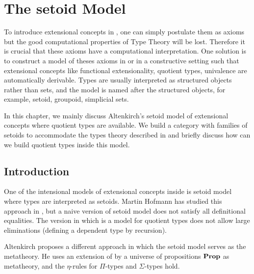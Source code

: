 

\chapter{The setoid Model}\label{models}


To introduce extensional concepts in \itt, one can simply postulate them as axioms but the good computational properties of Type Theory will be lost. Therefore it is crucial that these axioms have 
a computational interpretation. One solution is to construct a model of theses axioms in \itt or in a constructive setting such that extensional concepts like functional extensionality, quotient types, univalence are automatically derivable. Types are usually interpreted as structured objects rather than sets, and the model is named after the structured objects, for example, setoid, groupoid, simplicial sets. 



In this chapter, we mainly discuss Altenkirch's setoid model of extensional concepts where quotient types are available. We build a category with families of setoids to accommodate the types theory described in
\cite{alti:lics99}  and briefly discuss how can we build quotient types inside this model.

\section{Introduction}\label{setoidmodel}


One of the intensional models of extensional concepts inside \itt is setoid model where types are interpreted as setoids. Martin Hofmann has studied this approach in \cite{hof:phd}, but a naive version of setoid model does not satisfy all definitional equalities. The version in \cite{hof:95:sm} which is a model for quotient types does not allow large eliminations (defining a dependent type by recursion).

Altenkirch proposes \cite{alti:lics99} a different approach in which the setoid model serves as the metatheory.
He uses an extension of \itt by a universe of propositions $\operatorname{\mathbf{Prop}}$ as metatheory, and the $\eta$-rules for $\Pi$-types and $\Sigma$-types hold. 

